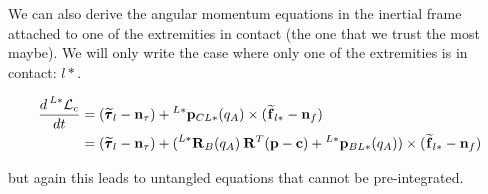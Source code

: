 \documentclass[11pt]{article}
\newcommand{\Rot}[2]{\prescript{#1}{}{\bfR}_{#2}}
\newcommand{\noise}{\bfn}
\newcommand{\posi}[2]{\prescript{#1}{}{\bfp}_{#2}}
\newcommand{\forcem}[2]{\prescript{#1}{}{\widetilde{\bff}}_{#2}}
\newcommand{\torquem}[2]{\prescript{#1}{}{\widetilde{\pmb{\tau}}}_{#2}}
\newcommand{\AM}{\mathcal{L}}
\newcommand{\COM}{\bfc}
\begin{document}
We can also derive the angular momentum equations in the inertial frame attached to one of the extremities in contact (the one that we trust the most maybe). We will only write the case where only one of the extremities is in contact: \(l*\).

\begin{equation}
\begin{split}
    \frac{d \prescript{L*}{}{\AM}_c}{dt} &=
    (\torquem{}{l} - \noise_{\tau}) + \posi{L*}{CL*}(q_A) \times (\forcem{}{l*} - \noise_f)
    \\
    &= (\torquem{}{l} - \noise_{\tau}) + (\Rot{L*}{B}(q_A)\Rot{}{}^T(\bfp - \COM) + \posi{L*}{BL*}(q_A)) \times (\forcem{}{l*} - \noise_f)
\end{split}
\end{equation}
 
but again this leads to untangled equations that cannot be pre-integrated.



\printbibliography
\end{document}
